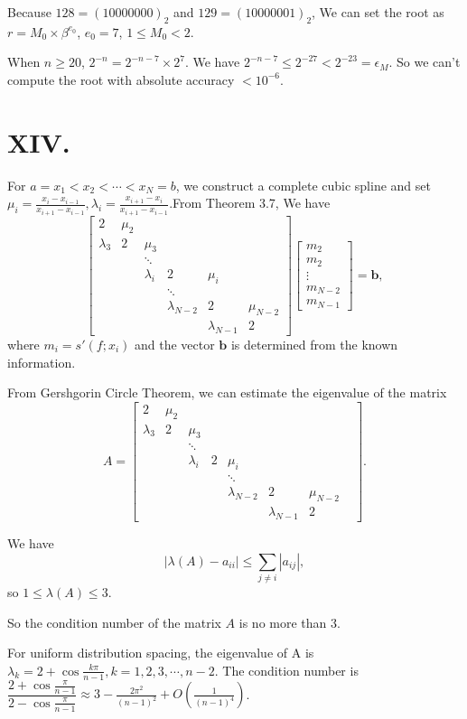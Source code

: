 \documentclass[a4paper]{article}
\begin{document}
Because $128=(10000000)_2$ and $129=(10000001)_2$, We can set the root as $r=M_0\times \beta^{e_0}$, $e_0=7$, $1\leq M_0 <2$. 

When $n\geq20$, $2^{-n}=2^{-n-7}\times 2^7$. We have $2^{-n-7}\leq 2^{-27}<2^{-23}=\epsilon_M$. So we can't compute the root with absolute accuracy $<10^{-6}$.


\section*{XIV.}
For $a=x_1<x_2<\cdots<x_N=b$, we construct a complete cubic spline and set $\mu_i=\frac{x_i-x_{i-1}}{x_{i+1}-x_{i-1}},\lambda_i=\frac{x_{i+1}-x_i}{x_{i+1}-x_{i-1}}$.From Theorem 3.7, We have 
$$\begin{bmatrix}2&\mu_{2}\\\lambda_{3}&2&\mu_{3}\\&&\ddots\\&&\lambda_{i}&2&\mu_{i}\\&&&\ddots&&\\&&&\lambda_{N-2}&2&\mu_{N-2}\\&&&&\lambda_{N-1}&2\end{bmatrix}\begin{bmatrix}m_{2}\\m_{2}\\\vdots\\m_{N-2}\\m_{N-1}\end{bmatrix}=\mathbf{b},$$
where $m_i = s'(f ; x_i)$ and the vector $\mathbf{b}$ is determined from the known information.

From Gershgorin Circle Theorem, we can estimate the eigenvalue of the matrix
$$
A=\begin{bmatrix}2&\mu_2&&&&&\\\lambda_3&2&\mu_3&&&&\\&&\ddots&&&&\\&&\lambda_i&2&\mu_i\\&&&&\ddots&&&\\&&&&\lambda_{N-2}&2&\mu_{N-2}\\&&&&&\lambda_{N-1}&2\end{bmatrix}.
$$

We have $$
|\lambda(A)-a_{ii}|\leq\sum_{j\neq i}|a_{ij}|,
$$
so $1\leq \lambda(A)\leq 3$.

So the condition number of the matrix $A$ is no more than 3. 

For uniform distribution spacing, the eigenvalue of A is $\lambda_k=2+\cos\frac{k\pi}{n-1},k=1,2,3,\cdots,n-2.$ The condition number is $\dfrac{2+\cos\frac{\pi}{n-1}}{2-\cos\frac{\pi}{n-1}}\approx3-\frac{2\pi^2}{(n-1)^2}+O\left(\frac1{(n-1)^4}\right)$.
\end{document}
